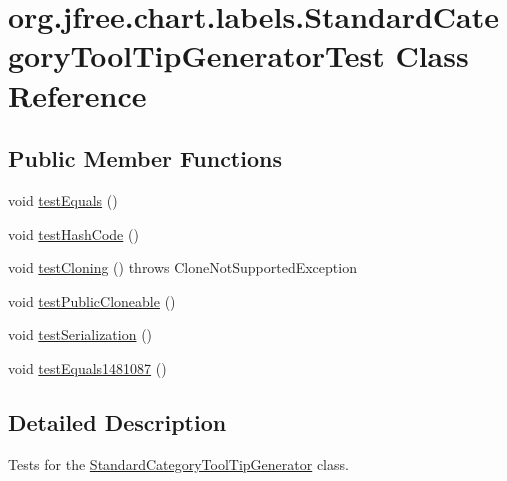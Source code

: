 \hypertarget{classorg_1_1jfree_1_1chart_1_1labels_1_1_standard_category_tool_tip_generator_test}{}\section{org.\+jfree.\+chart.\+labels.\+Standard\+Category\+Tool\+Tip\+Generator\+Test Class Reference}
\label{classorg_1_1jfree_1_1chart_1_1labels_1_1_standard_category_tool_tip_generator_test}
\subsection*{Public Member Functions}
\begin{DoxyCompactItemize}
\item 
void \mbox{\hyperlink{classorg_1_1jfree_1_1chart_1_1labels_1_1_standard_category_tool_tip_generator_test_a7fb3c8d2abc5fcea0ac92dc11ebfb48c}{test\+Equals}} ()
\item 
void \mbox{\hyperlink{classorg_1_1jfree_1_1chart_1_1labels_1_1_standard_category_tool_tip_generator_test_a085574e3ea6c421d326efe96b9e5e5dc}{test\+Hash\+Code}} ()
\item 
void \mbox{\hyperlink{classorg_1_1jfree_1_1chart_1_1labels_1_1_standard_category_tool_tip_generator_test_aad1e6855488a9a3b3a9d6201c47edd14}{test\+Cloning}} ()  throws Clone\+Not\+Supported\+Exception 
\item 
void \mbox{\hyperlink{classorg_1_1jfree_1_1chart_1_1labels_1_1_standard_category_tool_tip_generator_test_a688cc70390e9632686e994d21a5fa612}{test\+Public\+Cloneable}} ()
\item 
void \mbox{\hyperlink{classorg_1_1jfree_1_1chart_1_1labels_1_1_standard_category_tool_tip_generator_test_a7fc74bd6716bcea2039dc336d3813f29}{test\+Serialization}} ()
\item 
void \mbox{\hyperlink{classorg_1_1jfree_1_1chart_1_1labels_1_1_standard_category_tool_tip_generator_test_a80ad3c3b4f809266bfd1d9bebcb9df9b}{test\+Equals1481087}} ()
\end{DoxyCompactItemize}


\subsection{Detailed Description}
Tests for the \mbox{\hyperlink{classorg_1_1jfree_1_1chart_1_1labels_1_1_standard_category_tool_tip_generator}{Standard\+Category\+Tool\+Tip\+Generator}} class. 

